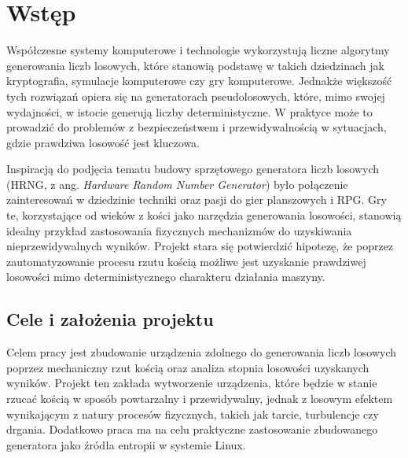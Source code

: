 \chapter{Wstęp}\label{ch:wstep}



Współczesne systemy komputerowe i technologie wykorzystują liczne algorytmy generowania liczb losowych, które stanowią podstawę w takich dziedzinach jak kryptografia,
symulacje komputerowe czy gry komputerowe.
Jednakże większość tych rozwiązań opiera się na generatorach pseudolosowych,
które, mimo swojej wydajności, w istocie generują liczby deterministyczne.
W praktyce może to prowadzić do problemów z bezpieczeństwem i przewidywalnością w sytuacjach, gdzie prawdziwa losowość jest kluczowa.

Inspiracją do podjęcia tematu budowy sprzętowego generatora liczb losowych (HRNG, z ang. \textit{Hardware Random Number Generator})
było połączenie zainteresowań w dziedzinie techniki oraz pasji do gier planszowych i RPG. %
Gry te, korzystające od wieków z kości jako narzędzia generowania losowości, stanowią idealny przykład zastosowania fizycznych mechanizmów do uzyskiwania nieprzewidywalnych wyników.
Projekt stara się potwierdzić hipotezę, że poprzez zautomatyzowanie procesu rzutu kością możliwe jest uzyskanie prawdziwej losowości mimo deterministycznego charakteru działania maszyny.

\section{Cele i założenia projektu}\label{sec:cel-projektu}

Celem pracy jest zbudowanie urządzenia zdolnego do generowania liczb losowych poprzez mechaniczny rzut kością oraz analiza stopnia losowości uzyskanych wyników.
Projekt ten zakłada wytworzenie urządzenia, które będzie w stanie rzucać kością w sposób powtarzalny i przewidywalny,
jednak z losowym efektem wynikającym z natury procesów fizycznych, takich jak tarcie, turbulencje czy drgania.
Dodatkowo praca ma na celu praktyczne zastosowanie zbudowanego generatora jako źródła entropii w systemie Linux.

